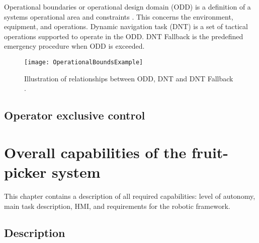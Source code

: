 \documentclass[%
oneside,    %
project,    %
nosummary   %
]{USN-MSc}
\begin{document}
Operational boundaries or operational design domain (ODD) is a definition of a systems operational area and constraints \cite{norwegiandefinitions}. This concerns the environment, equipment, and operations. 
Dynamic navigation task (DNT) is a set of tactical operations supported to operate in the ODD.
DNT Fallback is the predefined emergency procedure when ODD is exceeded.

\begin{figure}[!ht]
  \centering
  \texttt{[image: OperationalBoundsExample]}
  \caption{Illustration of relationships between ODD, DNT and DNT Fallback \cite{norwegiandefinitions}.}
  \label{fig:OpBoundsEx}
\end{figure}

\section{Operator exclusive control}


\chapter{Overall capabilities of the fruit-picker system}
\label{ch:overalCap}
This chapter contains a description of all required capabilities: level of autonomy, main task description, HMI, and requirements for the robotic framework.
\section{Description}

~\nocite{*}

\cleardoublepage

\printbibliography[heading=bibintoc, title={References}]


\end{document}
